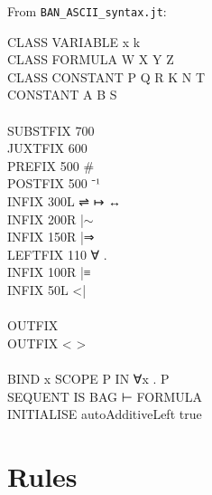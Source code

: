From \texttt{BAN\_ASCII\_syntax.jt}:
\begin{japeish}
CLASS VARIABLE x k \\
CLASS FORMULA W X Y Z \\
CLASS CONSTANT P Q R K N T \\
CONSTANT A B S \\
 \\
SUBSTFIX    700 \\
JUXTFIX     600 \\
PREFIX      500     \# \\
POSTFIX     500     ⁻¹ \\
INFIX       300L    ⇌  ↦ ↔ \\
INFIX       200R    |$\sim$ \\
INFIX       150R    |⇒ \\
LEFTFIX     110 ∀ . \\
INFIX       100R    |≡ \\
INFIX       50L     <| \\
 \\
OUTFIX {  } \\
OUTFIX <  > \\
 \\
BIND x SCOPE P IN ∀x . P \\
SEQUENT IS BAG ⊢ FORMULA \\
INITIALISE autoAdditiveLeft true
\end{japeish}

\section{Rules}

